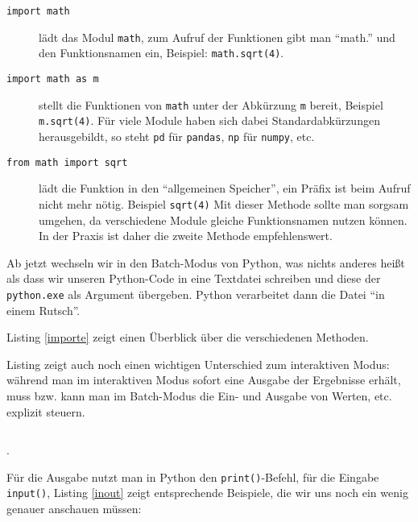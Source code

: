 \documentclass[12pt,ngerman]{scrreprt}
\newcommand{\ta}[1]{\textattachfile[color=1 0 0]{#1}{\faFilePowerpointO}}
\newcommand{\pypyl}[3]{}
\begin{document}
\begin{description}
\item[\texttt{import math}] lädt das Modul \texttt{math}, zum Aufruf der Funktionen gibt man \enquote{math.} und den Funktionsnamen ein, Beispiel: \texttt{math.sqrt(4)}.
\item[\texttt{import math as m}] stellt die Funktionen von \texttt{math} unter der Abkürzung \texttt{m} bereit, Beispiel \texttt{m.sqrt(4)}. Für viele Module haben sich dabei Standardabkürzungen herausgebildt, so steht \texttt{pd} für \texttt{pandas}, \texttt{np} für \texttt{numpy}, etc.
\item[\texttt{from math import sqrt}] lädt die Funktion in den \enquote{allgemeinen Speicher}, ein Präfix ist beim Aufruf nicht mehr nötig. Beispiel \texttt{sqrt(4)} Mit dieser Methode sollte man sorgsam umgehen, da verschiedene Module gleiche Funktionsnamen nutzen können. In der Praxis ist daher die zweite Methode empfehlenswert.
\end{description}

Ab jetzt wechseln wir in den Batch-Modus von Python, was nichts anderes heißt als dass wir unseren Python-Code in eine Textdatei schreiben und diese der \texttt{python.exe} als Argument übergeben. Python verarbeitet dann die Datei \enquote{in einem Rutsch}.


Listing \ref{importe} zeigt einen Überblick über die verschiedenen Methoden.

\pypyl{Überblick der Import-Methoden}{Codes/importe.py}{importe}

Listing zeigt auch noch einen wichtigen Unterschied zum interaktiven Modus: während man im interaktiven Modus sofort eine Ausgabe der Ergebnisse erhält, muss bzw. kann man im Batch-Modus die Ein- und Ausgabe von Werten, etc. explizit steuern. 

\inputminted[bgcolor=bg]{python}{Codes/importe.py}.

Für die Ausgabe nutzt man in Python den \texttt{print()}-Befehl, für die Eingabe \texttt{input()}, Listing \ref{inout} zeigt entsprechende Beispiele, die wir uns noch ein wenig genauer anschauen müssen:
\end{document}
